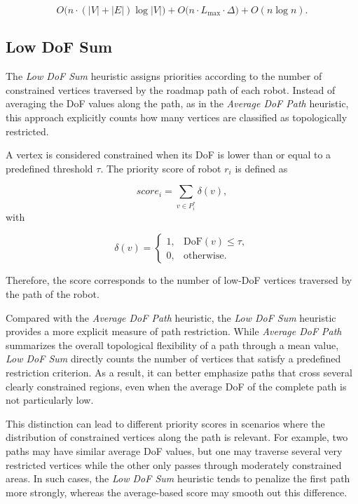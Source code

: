 \begin{equation}
\label{eq:average_dof_heuristic}
    O\bigl(n \cdot (|V| + |E|)\log|V|\bigr)
    + O\bigl(n \cdot L_{\max} \cdot \Delta\bigr)
    + O(n \log n).
\end{equation}



\subsection{Low DoF Sum}
\label{subsec:low_dof_sum}
\hspace{\parindent}
The \textit{Low DoF Sum} heuristic assigns priorities according to the number of constrained vertices traversed by the roadmap path of each robot. Instead of averaging the DoF values along the path, as in the \textit{Average DoF Path} heuristic, this approach explicitly counts how many vertices are classified as topologically restricted.

A vertex is considered constrained when its DoF is lower than or equal to a predefined threshold \(\tau\). The priority score of robot \(r_i\) is defined as

\begin{equation}
    score_i =
    \sum_{v \in P_i^\ast} \delta(v),
\end{equation}
with

\begin{equation}
\delta(v)=
\begin{cases}
1, & \mathrm{DoF}(v) \leq \tau, \\
0, & \text{otherwise}.
\end{cases}
\end{equation}

Therefore, the score corresponds to the number of low-DoF vertices traversed by the path of the robot.

Compared with the \textit{Average DoF Path} heuristic, the \textit{Low DoF Sum} heuristic provides a more explicit measure of path restriction. While \textit{Average DoF Path} summarizes the overall topological flexibility of a path through a mean value, \textit{Low DoF Sum} directly counts the number of vertices that satisfy a predefined restriction criterion. As a result, it can better emphasize paths that cross several clearly constrained regions, even when the average DoF of the complete path is not particularly low.

This distinction can lead to different priority scores in scenarios where the distribution of constrained vertices along the path is relevant. For example, two paths may have similar average DoF values, but one may traverse several very restricted vertices while the other only passes through moderately constrained areas. In such cases, the \textit{Low DoF Sum} heuristic tends to penalize the first path more strongly, whereas the average-based score may smooth out this difference.

